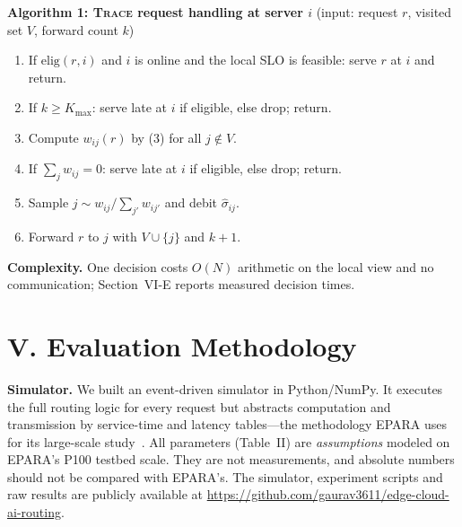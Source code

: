 \documentclass{article}
\newcommand{\sys}{\textsc{Trace}}
\begin{document}
\noindent\textbf{Algorithm 1: \sys{} request handling at server $i$} (input: request $r$, visited set $V$, forward count $k$)
\begin{enumerate}
\item If $\mathrm{elig}(r,i)$ and $i$ is online and the local SLO is feasible: serve $r$ at $i$ and return.
\item If $k\ge K_{\max}$: serve late at $i$ if eligible, else drop; return.
\item Compute $w_{ij}(r)$ by (3) for all $j\notin V$.
\item If $\sum_j w_{ij}=0$: serve late at $i$ if eligible, else drop; return.
\item Sample $j\sim w_{ij}/\sum_{j'}w_{ij'}$ and debit $\hat\sigma_{ij}$.
\item Forward $r$ to $j$ with $V\cup\{j\}$ and $k+1$.
\end{enumerate}

\textbf{Complexity.} One decision costs $O(N)$ arithmetic on the local view and no communication; Section~VI-E reports measured decision times.

\section*{V. Evaluation Methodology}

\textbf{Simulator.} We built an event-driven simulator in Python/NumPy. It executes the full routing logic for every request but abstracts computation and transmission by service-time and latency tables---the methodology EPARA uses for its large-scale study~\cite{epara2025}. All parameters (Table~II) are \emph{assumptions} modeled on EPARA's P100 testbed scale. They are not measurements, and absolute numbers should not be compared with EPARA's. The simulator, experiment scripts and raw results are publicly available at \url{https://github.com/gaurav3611/edge-cloud-ai-routing}.
\end{document}
